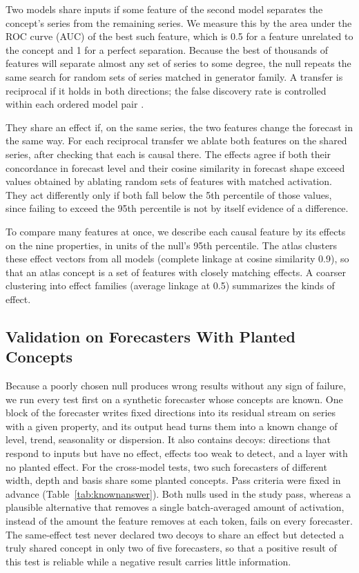 \documentclass[twoside,11pt]{article}
\begin{document}
Two models share inputs if some feature of the second model separates the concept's series from the remaining series.
We measure this by the area under the ROC curve (AUC) of the best such feature, which is 0.5 for a feature unrelated to the concept and 1 for a perfect separation.
Because the best of thousands of features will separate almost any set of series to some degree, the null repeats the same search for random sets of series matched in generator family.
A transfer is reciprocal if it holds in both directions; the false discovery rate is controlled within each ordered model pair \citep{benjamini1995fdr}.

They share an effect if, on the same series, the two features change the forecast in the same way.
For each reciprocal transfer we ablate both features on the shared series, after checking that each is causal there.
The effects agree if both their concordance in forecast level and their cosine similarity in forecast shape exceed values obtained by ablating random sets of features with matched activation.
They act differently only if both fall below the 5th percentile of those values, since failing to exceed the 95th percentile is not by itself evidence of a difference.

To compare many features at once, we describe each causal feature by its effects on the nine properties, in units of the null's 95th percentile.
The atlas clusters these effect vectors from all models (complete linkage at cosine similarity 0.9), so that an atlas concept is a set of features with closely matching effects.
A coarser clustering into effect families (average linkage at 0.5) summarizes the kinds of effect.

\subsection{Validation on Forecasters With Planted Concepts}
\label{sec:knownanswer}

Because a poorly chosen null produces wrong results without any sign of failure, we run every test first on a synthetic forecaster whose concepts are known.
One block of the forecaster writes fixed directions into its residual stream on series with a given property, and its output head turns them into a known change of level, trend, seasonality or dispersion.
It also contains decoys: directions that respond to inputs but have no effect, effects too weak to detect, and a layer with no planted effect.
For the cross-model tests, two such forecasters of different width, depth and basis share some planted concepts.
Pass criteria were fixed in advance (Table~\ref{tab:knownanswer}).
Both nulls used in the study pass, whereas a plausible alternative that removes a single batch-averaged amount of activation, instead of the amount the feature removes at each token, fails on every forecaster.
The same-effect test never declared two decoys to share an effect but detected a truly shared concept in only two of five forecasters, so that a positive result of this test is reliable while a negative result carries little information.
\end{document}
